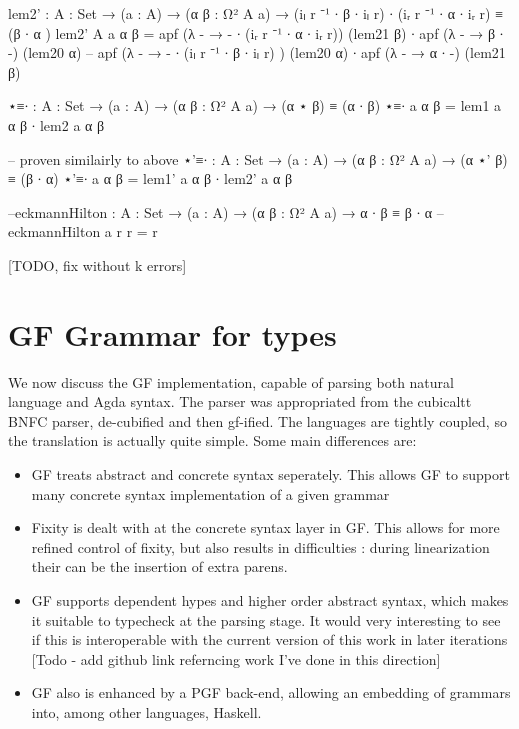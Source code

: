 \documentclass[11pt, a4paper]{article}
\begin{document}
\begin{code}
  lem2' : {A : Set} → (a : A) → (α β : Ω² {A} a) → (iₗ r ⁻¹ ∙ β ∙ iₗ r) ∙ (iᵣ r ⁻¹ ∙ α ∙ iᵣ r) ≡ (β ∙ α )
  lem2' {A} a α β =  apf  (λ - → - ∙ (iᵣ r ⁻¹ ∙ α ∙ iᵣ r)) (lem21 β) ∙ apf (λ - → β ∙ -) (lem20 α)
  -- apf (λ - → - ∙ (iₗ r ⁻¹ ∙ β ∙ iₗ r) ) (lem20 α) ∙ apf (λ - → α ∙ -) (lem21 β)

  ⋆≡∙ : {A : Set} → (a : A) → (α β : Ω² {A} a) → (α ⋆ β) ≡ (α ∙ β)
  ⋆≡∙ a α β = lem1 a α β ∙ lem2 a α β

  -- proven similairly to above 
  ⋆'≡∙ : {A : Set} → (a : A) → (α β : Ω² {A} a) → (α ⋆' β) ≡ (β ∙ α)
  ⋆'≡∙ a α β = lem1' a α β ∙ lem2' a α β


  --eckmannHilton : {A : Set} → (a : A) → (α β : Ω² {A} a) → α ∙ β ≡ β ∙ α 
  --eckmannHilton a r r = r

\end{code}

[TODO, fix without k errors]

\section{GF Grammar for types}

We now discuss the GF implementation, capable of parsing both natural language
and Agda syntax. The parser was appropriated from the cubicaltt BNFC parser,
de-cubified and then gf-ified. The languages are tightly coupled, so the
translation is actually quite simple. Some main differences are:

\begin{itemize}[noitemsep]

\item GF treats abstract and concrete syntax seperately. This allows GF to
support many concrete syntax implementation of a given grammar

\item Fixity is dealt with at the concrete syntax layer in GF.  This allows for
more refined control of fixity, but also results in difficulties : during
linearization their can be the insertion of extra parens.

\item GF supports dependent hypes and higher order abstract syntax, which makes
it suitable to typecheck at the parsing stage. It would very interesting to see
if this is interoperable with the current version of this work in later
iterations [Todo - add github link referncing work I've done in this direction]

\item GF also is enhanced by a PGF back-end, allowing an embedding of grammars
into, among other languages, Haskell.

\end{itemize}
\end{document}
